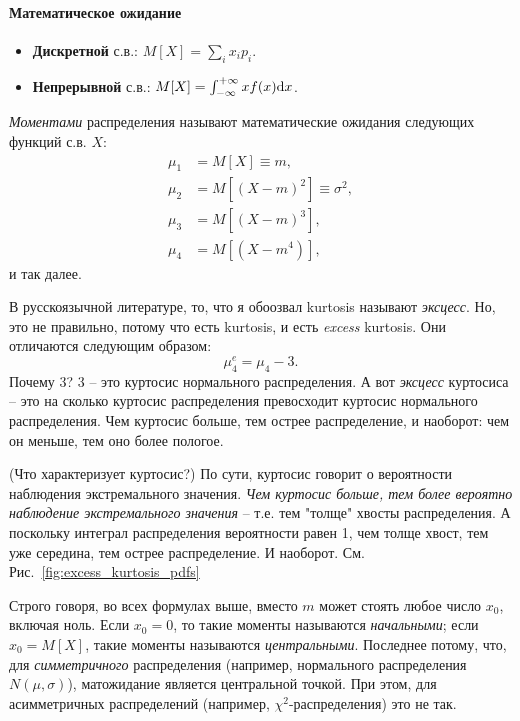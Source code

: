 \documentclass{report}
\begin{document}
\paragraph{Математическое ожидание}
\begin{itemize}
	\item \textbf{Дискретной} с.в.: $M[X] = \sum_i x_i p_i$.
	\item \textbf{Непрерывной} с.в.: $M[X] = \int_{-\infty}^{+\infty} xf(x)\mathrm d x$.
\end{itemize}
\emph{Моментами} распределения называют математические ожидания следующих функций с.в. $X$:
\begin{align}
	\mu_1 &= M\left[X\right] \equiv m, \tag{матожидание}\\
	\mu_2 &= M\left[(X-m)^2\right] \equiv \sigma^2, \tag{дисперсия}\\
	\mu_3 &= M\left[(X-m)^3\right], \tag{асимметрия}\\
	\mu_4 &= M\left[(X-m^4)\right], \tag{kurtosis}
\end{align}
и так далее.

\begin{rmk}[Терминология]
	В русскоязычной литературе, то, что я обоозвал kurtosis называют \emph{эксцесс}.
	Но, это не правильно, потому что есть kurtosis, и есть \emph{excess} kurtosis.
	Они отличаются следующим образом:
	\[
	\mu_4^e = \mu_4 - 3.
	\]
	Почему 3? 3 -- это куртосис нормального распределения. А вот \emph{эксцесс} куртосиса -- это на сколько
	куртосис распределения превосходит куртосис нормального распределения. Чем куртосис больше, тем острее распределение, и наоборот: чем он меньше, тем оно более пологое.
\end{rmk}

\begin{rmk}(Что характеризует куртосис?)
	По сути, куртосис говорит о вероятности наблюдения экстремального значения. \emph{Чем куртосис больше, тем более вероятно наблюдение экстремального значения} -- т.е. тем "толще" хвосты распределения. А поскольку интеграл распределения вероятности равен 1, чем толще хвост, тем уже середина, тем острее распределение. И наоборот. См. Рис.~\ref{fig:excess_kurtosis_pdfs}
\end{rmk}

\begin{rmk}
	Строго говоря, во всех формулах выше, вместо $m$ может стоять любое число $x_0$, включая ноль.
	Если $x_0=0$, то такие моменты называются \emph{начальными}; если $x_0 = M\left[ X\right]$, такие моменты называются \emph{центральными}. Последнее потому, что, для \emph{симметричного} распределения (например, нормального распределения $N(\mu, \sigma)$), матожидание является
	центральной точкой. При этом, для асимметричных распределений (например, $\chi^2$-распределения) это не так.
\end{rmk}
\end{document}
